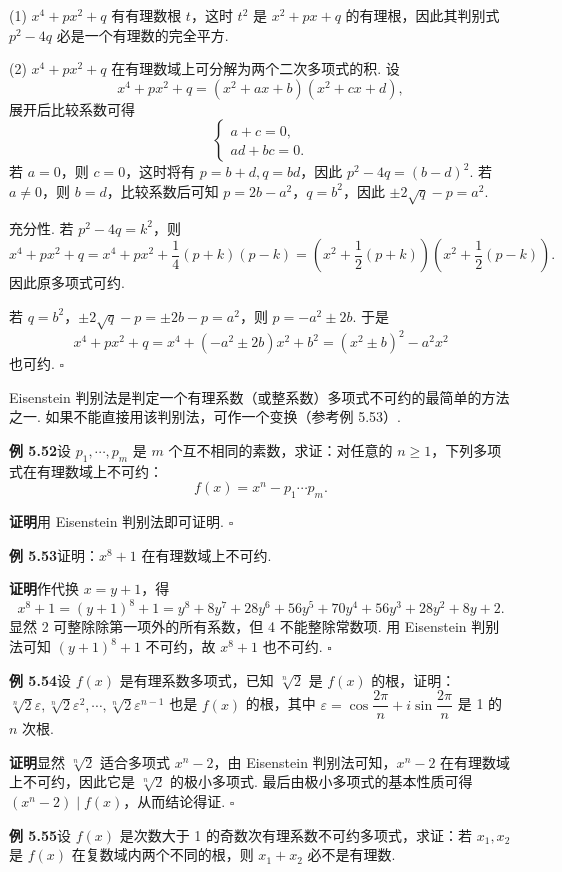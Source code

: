 \documentclass[UTF8, 12pt, fontset=fandol, oneside]{ctexart}
\begin{document}
(1) $x^4+px^2+q$ 有有理数根 $t$，这时 $t^2$ 是 $x^2+px+q$ 的有理根，因此其判别式 $p^2-4q$ 必是一个有理数的完全平方.

(2) $x^4+px^2+q$ 在有理数域上可分解为两个二次多项式的积. 设
\[
x^4+px^2+q=(x^2+ax+b)(x^2+cx+d),
\]
展开后比较系数可得
\[
\left\{
\begin{array}{l}
a+c=0,\\
ad+bc=0.
\end{array}
\right.
\]
若 $a=0$，则 $c=0$，这时将有 $p=b+d,q=bd$，因此 $p^2-4q=(b-d)^2$. 若 $a\ne0$，则 $b=d$，比较系数后可知 $p=2b-a^2$，$q=b^2$，因此 $\pm2\sqrt q-p=a^2$.

充分性. 若 $p^2-4q=k^2$，则
\[
x^4+px^2+q=x^4+px^2+\frac14(p+k)(p-k)
=\left(x^2+\frac12(p+k)\right)\left(x^2+\frac12(p-k)\right).
\]
因此原多项式可约.

若 $q=b^2$，$\pm2\sqrt q-p=\pm2b-p=a^2$，则 $p=-a^2\pm2b$. 于是
\[
x^4+px^2+q=x^4+(-a^2\pm2b)x^2+b^2=(x^2\pm b)^2-a^2x^2
\]
也可约. \hfill $\square$

Eisenstein 判别法是判定一个有理系数（或整系数）多项式不可约的最简单的方法之一. 如果不能直接用该判别法，可作一个变换（参考例 5.53）.

\noindent\textbf{例 5.52}\quad 设 $p_1,\cdots,p_m$ 是 $m$ 个互不相同的素数，求证：对任意的 $n\ge1$，下列多项式在有理数域上不可约：
\[
f(x)=x^n-p_1\cdots p_m.
\]

\noindent\textbf{证明}\quad 用 Eisenstein 判别法即可证明. \hfill $\square$

\noindent\textbf{例 5.53}\quad 证明：$x^8+1$ 在有理数域上不可约.

\noindent\textbf{证明}\quad 作代换 $x=y+1$，得
\[
x^8+1=(y+1)^8+1=y^8+8y^7+28y^6+56y^5+70y^4+56y^3+28y^2+8y+2.
\]
显然 2 可整除除第一项外的所有系数，但 4 不能整除常数项. 用 Eisenstein 判别法可知 $(y+1)^8+1$ 不可约，故 $x^8+1$ 也不可约. \hfill $\square$

\noindent\textbf{例 5.54}\quad 设 $f(x)$ 是有理系数多项式，已知 $\sqrt[n]{2}$ 是 $f(x)$ 的根，证明：$\sqrt[n]{2}\varepsilon,\sqrt[n]{2}\varepsilon^2,\cdots,\sqrt[n]{2}\varepsilon^{n-1}$ 也是 $f(x)$ 的根，其中 $\varepsilon=\cos\dfrac{2\pi}{n}+i\sin\dfrac{2\pi}{n}$ 是 1 的 $n$ 次根.

\noindent\textbf{证明}\quad 显然 $\sqrt[n]{2}$ 适合多项式 $x^n-2$，由 Eisenstein 判别法可知，$x^n-2$ 在有理数域上不可约，因此它是 $\sqrt[n]{2}$ 的极小多项式. 最后由极小多项式的基本性质可得 $(x^n-2)\mid f(x)$，从而结论得证. \hfill $\square$

\noindent\textbf{例 5.55}\quad 设 $f(x)$ 是次数大于 1 的奇数次有理系数不可约多项式，求证：若 $x_1,x_2$ 是 $f(x)$ 在复数域内两个不同的根，则 $x_1+x_2$ 必不是有理数.
\end{document}
